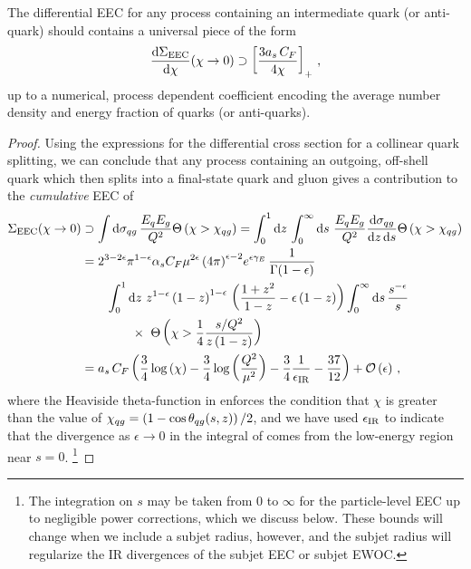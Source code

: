 \begin{proposition}{}{}
 The differential EEC for any process containing an intermediate quark (or anti-quark) should contains a universal piece of the form
\begin{align}
    \label{eq:universal_differential_eec}
    \frac{\dd \Sigma_\text{EEC}}{\dd \chi}
    (\chi \to 0)
    \supset
    \le[
    \frac{3\ascf}{4\chi}
    \ri]_+
    \,,
\end{align}
up to a numerical, process dependent coefficient encoding the average number density and energy fraction of quarks (or anti-quarks).
\end{proposition}


\begin{proof}
Using the expressions for the differential cross section for a collinear quark splitting, we can conclude that any process containing an outgoing, off-shell quark which then splits into a final-state quark and gluon gives a contribution to the \textit{cumulative} EEC of
\begin{subequations}
\label{eq:eec_pair}
\begin{align}
    \Sigma_\text{EEC}(\chi \to 0)
    &\supset
    \int \dd\sigma_{qg} \,
        \frac{E_q E_g}{Q^2}
        \Theta\le(\chi > \chi_{qg}\ri)
    =
    \int_0^1 \dd z \,
    \int_0^\infty \dd s
        \,\,
        \frac{E_q E_g}{Q^2}
        \frac{\dd \sigma_{qg}}{\dd z\, \dd s}
        \Theta\le(\chi > \chi_{qg}\ri)
    \\
    \notag
    &=
    2^{3-2\epsilon} \pi^{1-\epsilon}
    \alpha_s C_F
    \mu^{2\epsilon}\,
    {(4\pi)}^{\epsilon-2}
    e^{\epsilon \gamma_E}
    \,
    \frac{1}{\Gamma(1-\epsilon)}
    \\
    \label{eq:eec-lim-b}
    &
    \qquad
    \int_0^1 \dd z
        \,\,
        z^{1-\epsilon}\le(1-z\ri)^{1-\epsilon}
        \,
        \le(
            \frac{1 + z^2}{1-z} - \epsilon \le(1-z\ri)
        \ri)
    \int_0^\infty \dd s
        \,
        \frac{s^{-\epsilon}}{s}
    \\
    \notag&
    \qquad\qquad
        \times\,\,\Theta\le(\chi > \frac{1}{4}\frac{s/Q^2}{z\le(1-z\ri)}\ri)
    \\
    \label{eq:eec_pair_final}
    &=
    \ascf
    \le(
        \frac{3}{4}\log\le(\chi\ri)
        -
        \frac{3}{4}\log\le(\frac{Q^2}{\mu^2}\ri)
        -
        \frac{3}{4}\frac{1}{\epsir}
        -
        \frac{37}{12}
    \ri)
    +
    \mc O\le(\epsilon\ri)
    \,,
\end{align}
\end{subequations}
where the Heaviside theta-function in  enforces the condition that \(\chi\) is greater than the value of \(\chi_{qg} = \left(1 - \cos\theta_{qg}(s,z)\right)/2\), and we have used \(\epsilon_\text{IR}\) to indicate that the divergence as \(\epsilon \to 0\) in the integral of  comes from the low-energy region near \(s = 0\).%
\footnote{
    The integration on \(s\) may be taken from 0 to \(\infty\) for the particle-level EEC up to negligible power corrections, which we discuss below.
    These bounds will change when we include a subjet radius, however, and the subjet radius will regularize the IR divergences of the subjet EEC or subjet EWOC.
}


\end{proof}
